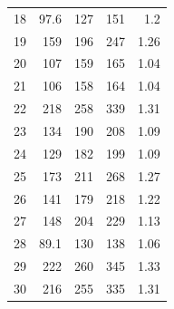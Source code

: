 \documentclass{article}
\begin{document}
\begin{table}[htbp!]
\begin{tabular}{lrr|>{\columncolor{black!50!white}\color{white}}r|>{\columncolor{black!50!white}\color{white}}r}
18 & 97.6 & 127 & 151 & 1.2 \\
19 & 159 & 196 & 247 & 1.26 \\
20 & 107 & 159 & 165 & 1.04 \\
21 & 106 & 158 & 164 & 1.04 \\
22 & 218 & 258 & 339 & 1.31 \\
23 & 134 & 190 & 208 & 1.09 \\
24 & 129 & 182 & 199 & 1.09 \\
25 & 173 & 211 & 268 & 1.27 \\
26 & 141 & 179 & 218 & 1.22 \\
27 & 148 & 204 & 229 & 1.13 \\
28 & 89.1 & 130 & 138 & 1.06 \\
29 & 222 & 260 & 345 & 1.33 \\
30 & 216 & 255 & 335 & 1.31 \\
\bottomrule
\end{tabular}
\endgroup
\end{table}
\end{document}
